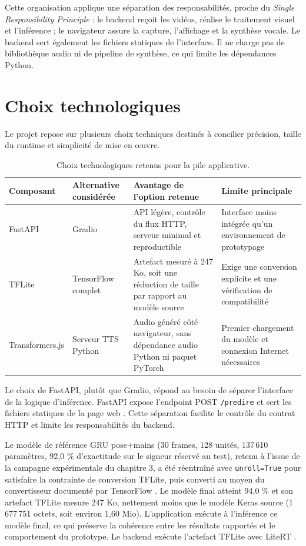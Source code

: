 Cette organisation applique une séparation des responsabilités, proche du \textit{Single Responsibility Principle} : le backend reçoit les vidéos, réalise le traitement visuel et l'inférence ; le navigateur assure la capture, l'affichage et la synthèse vocale. Le backend sert également les fichiers statiques de l'interface. Il ne charge pas de bibliothèque audio ni de pipeline de synthèse, ce qui limite les dépendances Python.

\section{Choix technologiques}

Le projet repose sur plusieurs choix techniques destinés à concilier précision, taille du runtime et simplicité de mise en œuvre.

\begin{table}[ht]
\centering
\small
\caption{Choix technologiques retenus pour la pile applicative.}
\label{tab:choix-techniques}
\begin{tabular}{p{3.0cm}p{3.2cm}p{3.3cm}p{3.3cm}}
\hline
Composant & Alternative considérée & Avantage de l'option retenue & Limite principale \\
\hline
FastAPI & Gradio & API légère, contrôle du flux HTTP, serveur minimal et reproductible & Interface moins intégrée qu'un environnement de prototypage \\
TFLite & TensorFlow complet & Artefact mesuré à 247 Ko, soit une réduction de taille par rapport au modèle source & Exige une conversion explicite et une vérification de compatibilité \\
Transformers.js & Serveur TTS Python & Audio généré côté navigateur, sans dépendance audio Python ni paquet PyTorch & Premier chargement du modèle et connexion Internet nécessaires \\
\hline
\end{tabular}
\end{table}

Le choix de FastAPI, plutôt que Gradio, répond au besoin de séparer l'interface de la logique d'inférence. FastAPI expose l'endpoint POST \texttt{/predire} et sert les fichiers statiques de la page web . Cette séparation facilite le contrôle du contrat HTTP et limite les responsabilités du backend.

Le modèle de référence GRU pose+mains (30 frames, 128 unités, 137\,610 paramètres, 92,0 \% d'exactitude sur le signeur réservé au test), retenu à l'issue de la campagne expérimentale du chapitre 3, a été réentraîné avec \texttt{unroll=True} pour satisfaire la contrainte de conversion TFLite, puis converti au moyen du convertisseur documenté par TensorFlow . Le modèle final atteint 94,0 \% et son artefact TFLite mesure 247 Ko, nettement moins que le modèle Keras source (1\,677\,751 octets, soit environ 1,60 Mio). L'application exécute à l'inférence ce modèle final, ce qui préserve la cohérence entre les résultats rapportés et le comportement du prototype. Le backend exécute l'artefact TFLite avec LiteRT .

